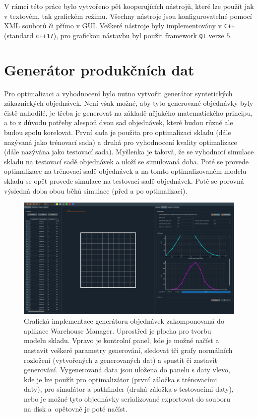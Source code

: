 V rámci této práce bylo vytvořeno pět kooperujících nástrojů, které lze použít jak v textovém, tak grafickém režimu. Všechny nástroje jsou konfigurovatelné pomocí XML souborů či přímo v GUI. Veškeré nástroje byly implementovány v \texttt{C++} (standard \texttt{c++17}), pro grafickou nástavbu byl použit framework \texttt{Qt} verze $5$.

\section{Generátor produkčních dat}
Pro optimalizaci a vyhodnocení bylo nutno vytvořit generátor syntetických zákaznických objednávek. Není však možné, aby tyto generované objednávky byly čistě nahodilé, je třeba je generovat na základě nějakého matematického principu, a to z důvodu potřeby alespoň dvou sad objednávek, které budou různé ale budou spolu korelovat. První sada je použita pro optimalizaci skladu (dále nazývaná jako trénovací sada) a druhá pro vyhodnocení kvality optimalizace (dále nazývána jako testovací sada). Myšlenka je taková, že se vyhodnotí simulace skladu na testovací sadě objednávek a uloží se simulovaná doba. Poté se provede optimalizace na trénovací sadě objednávek a na tomto optimalizovaném modelu skladu se opět provede simulace na testovací sadě objednávek. Poté se porovná výsledná doba obou běhů simulace (před a po optimalizaci).

\begin{figure}[t]
    \centering
    \includegraphics[width=0.99\linewidth]{figures/implementace/WarehouseManagerGen.png}
    \caption{Grafická implementace generátoru objednávek zakomponovaná do aplikace Warehouse Manager. Uprostřed je plocha pro tvorbu modelu skladu. Vpravo je kontrolní panel, kde je možné načíst a nastavit veškeré parametry generování, sledovat tři grafy normálních rozložení (vytvořených z generovaných dat) a spustit či zastavit generování. Vygenerovaná data jsou uložena do panelu s daty vlevo, kde je lze použít pro optimalizátor (první záložka s trénovacími daty), pro simulátor a pathfinder (druhá záložka s testovacími daty), nebo je možné tyto objednávky serializované exportovat do souboru na disk a~opětovně je poté načíst.}
    \label{fig:UI_generator}
\end{figure}

